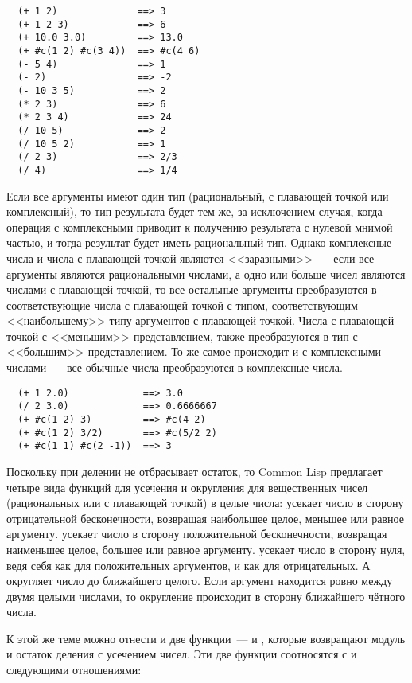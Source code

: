 \begin{verbatim}
  (+ 1 2)              ==> 3
  (+ 1 2 3)            ==> 6
  (+ 10.0 3.0)         ==> 13.0
  (+ #c(1 2) #c(3 4))  ==> #c(4 6)
  (- 5 4)              ==> 1
  (- 2)                ==> -2
  (- 10 3 5)           ==> 2
  (* 2 3)              ==> 6
  (* 2 3 4)            ==> 24
  (/ 10 5)             ==> 2
  (/ 10 5 2)           ==> 1
  (/ 2 3)              ==> 2/3
  (/ 4)                ==> 1/4
\end{verbatim}

Если все аргументы имеют один тип (рациональный, с плавающей точкой или комплексный), то
тип результата будет тем же, за исключением случая, когда операция с комплексными приводит
к получению результата с нулевой мнимой частью, и тогда результат будет иметь рациональный
тип.  Однако комплексные числа и числа с плавающей точкой являются <<заразными>>~--- если все
аргументы являются рациональными числами, а одно или больше чисел являются числами с
плавающей точкой, то все остальные аргументы преобразуются в соответствующие числа с
плавающей точкой с типом, соответствующим <<наибольшему>> типу аргументов с плавающей
точкой.  Числа с плавающей точкой с <<меньшим>> представлением, также преобразуются в тип с
<<большим>> представлением.  То же самое происходит и с комплексными числами~--- все обычные
числа преобразуются в комплексные числа.

\begin{verbatim}
  (+ 1 2.0)             ==> 3.0
  (/ 2 3.0)             ==> 0.6666667
  (+ #c(1 2) 3)         ==> #c(4 2)
  (+ #c(1 2) 3/2)       ==> #c(5/2 2)
  (+ #c(1 1) #c(2 -1))  ==> 3
\end{verbatim}

Поскольку \code{/} при делении не отбрасывает остаток, то Common Lisp предлагает четыре
вида функций для усечения и округления для вещественных чисел (рациональных или с
плавающей точкой) в целые числа:  усекает число в сторону отрицательной
бесконечности, возвращая наибольшее целое, меньшее или равное аргументу. 
усекает число в сторону положительной бесконечности, возвращая наименьшее целое, большее
или равное аргументу.  усекает число в сторону нуля, ведя себя как
 для положительных аргументов, и как  для отрицательных.  А
 округляет число до ближайшего целого. Если аргумент находится ровно между
двумя целыми числами, то округление происходит в сторону ближайшего чётного числа.

К этой же теме можно отнести и две функции~---  и , которые возвращают
модуль и остаток деления с усечением чисел.  Эти две функции соотносятся с  и
 следующими отношениями:
  
